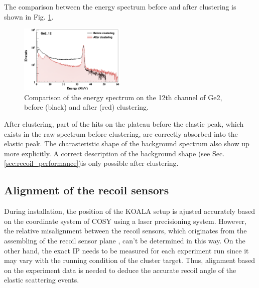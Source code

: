 \documentclass[number,5p]{elsarticle}
\begin{document}
The comparison between the energy spectrum before and after clustering is shown in
Fig. \ref{fig:clustering}.
\begin{figure}[h]
  \centering
  \includegraphics[width=0.45\textwidth]{./clustering.png}
  \caption{Comparison of the energy spectrum on the 12th channel of Ge2, before (black) and after
    (red) clustering.}
  \label{fig:clustering}
\end{figure}
After clustering, part of the hits on the plateau before the elastic peak, which exists in the raw spectrum before clustering, are correctly absorbed into the elastic peak.
The charasteristic shape of the background spectrum also show up more explicitly.
A correct description of the background shape (see Sec. \ref{sec:recoil_performance})is only possible after clustering.

\subsection{Alignment of the recoil sensors}
\label{sec:alignment}

During installation, the position of the KOALA setup is ajusted accurately based on the
coordinate system of COSY using a laser precisioning system.
However, the relative misalignment between the recoil sensors, which originates from the assembling of the recoil sensor plane , can't be determined in this way.
On the other hand, the exact IP needs to be measured for each experiment run
since it may vary with the running condition of the cluster target.
Thus, alignment based on the experiment data is needed to deduce the accurate recoil angle of the elastic scattering events.
\end{document}
